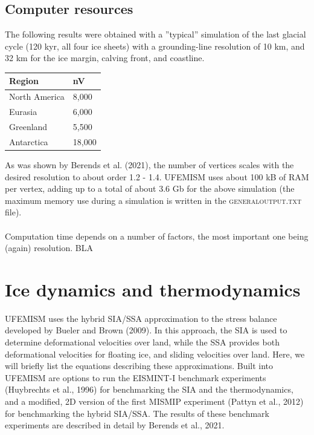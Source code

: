 \documentclass{article}
\begin{document}
\subsection{Computer resources}

The following results were obtained with a ''typical'' simulation of the last glacial cycle (120 kyr, all four ice sheets) with a grounding-line resolution of 10 km, and 32 km for the ice margin, calving front, and coastline.

\begin{table}[H]
  \begin{center}
    \begin{tabular}{l|l}
      \textbf{Region} & \textbf{nV} \\
      \hline
      North America & 8,000 \\
      Eurasia & 6,000 \\
      Greenland & 5,500 \\ 
      Antarctica & 18,000 \\
    \end{tabular}
  \end{center}
\end{table}

As was shown by Berends et al. (2021), the number of vertices scales with the desired resolution to about order 1.2 - 1.4. UFEMISM uses about 100 kB of RAM per vertex, adding up to a total of about 3.6 Gb for the above simulation (the maximum memory use during a simulation is written in the \textsc{general\textunderscore output.txt} file).\\
\\
Computation time depends on a number of factors, the most important one being (again) resolution. BLA

\newpage
\section{Ice dynamics and thermodynamics}

UFEMISM uses the hybrid SIA/SSA approximation to the stress balance developed by Bueler and Brown (2009). In this approach, the SIA is used to determine deformational velocities over land, while the SSA provides both deformational velocities for floating ice, and sliding velocities over land. Here, we will briefly list the equations describing these approximations. Built into UFEMISM are options to run the EISMINT-I benchmark experiments (Huybrechts et al., 1996) for benchmarking the SIA and the thermodynamics, and a modified, 2D version of the first MISMIP experiment (Pattyn et al., 2012) for benchmarking the hybrid SIA/SSA. The results of these benchmark experiments are described in detail by Berends et al., 2021.
\end{document}
